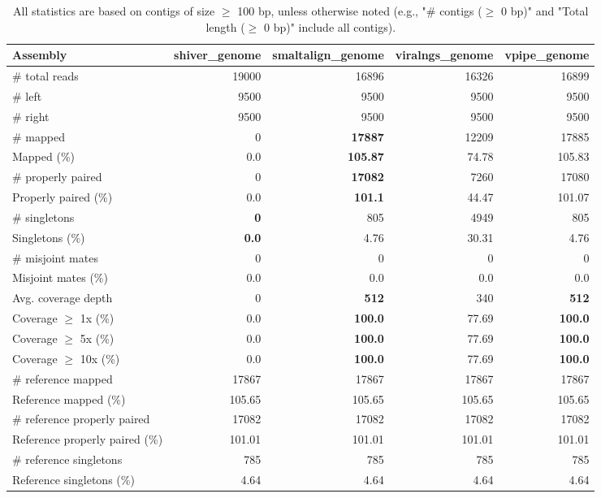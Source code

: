 \documentclass[12pt,a4paper]{article}
\begin{document}
\begin{table}[ht]
\begin{center}
\caption{All statistics are based on contigs of size $\geq$ 100 bp, unless otherwise noted (e.g., "\# contigs ($\geq$ 0 bp)" and "Total length ($\geq$ 0 bp)" include all contigs).}
\begin{tabular}{|l*{4}{|r}|}
\hline
Assembly & shiver\_genome & smaltalign\_genome & viralngs\_genome & vpipe\_genome \\ \hline
\# total reads & 19000 & 16896 & 16326 & 16899 \\ \hline
\# left & 9500 & 9500 & 9500 & 9500 \\ \hline
\# right & 9500 & 9500 & 9500 & 9500 \\ \hline
\# mapped & 0 & {\bf 17887} & 12209 & 17885 \\ \hline
Mapped (\%) & 0.0 & {\bf 105.87} & 74.78 & 105.83 \\ \hline
\# properly paired & 0 & {\bf 17082} & 7260 & 17080 \\ \hline
Properly paired (\%) & 0.0 & {\bf 101.1} & 44.47 & 101.07 \\ \hline
\# singletons & {\bf 0} & 805 & 4949 & 805 \\ \hline
Singletons (\%) & {\bf 0.0} & 4.76 & 30.31 & 4.76 \\ \hline
\# misjoint mates & 0 & 0 & 0 & 0 \\ \hline
Misjoint mates (\%) & 0.0 & 0.0 & 0.0 & 0.0 \\ \hline
Avg. coverage depth & 0 & {\bf 512} & 340 & {\bf 512} \\ \hline
Coverage $\geq$ 1x (\%) & 0.0 & {\bf 100.0} & 77.69 & {\bf 100.0} \\ \hline
Coverage $\geq$ 5x (\%) & 0.0 & {\bf 100.0} & 77.69 & {\bf 100.0} \\ \hline
Coverage $\geq$ 10x (\%) & 0.0 & {\bf 100.0} & 77.69 & {\bf 100.0} \\ \hline
\# reference mapped & 17867 & 17867 & 17867 & 17867 \\ \hline
Reference mapped (\%) & 105.65 & 105.65 & 105.65 & 105.65 \\ \hline
\# reference properly paired & 17082 & 17082 & 17082 & 17082 \\ \hline
Reference properly paired (\%) & 101.01 & 101.01 & 101.01 & 101.01 \\ \hline
\# reference singletons & 785 & 785 & 785 & 785 \\ \hline
Reference singletons (\%) & 4.64 & 4.64 & 4.64 & 4.64 \\ \hline

\end{tabular}
\end{center}
\end{table}
\end{document}
